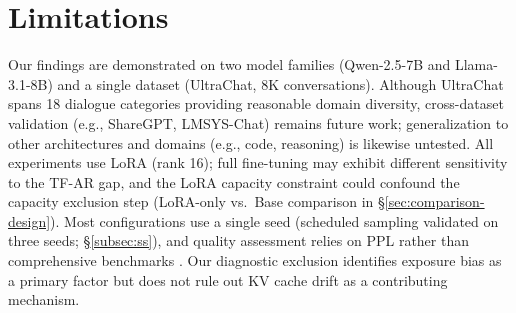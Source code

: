 \section*{Limitations}\label{sec:limitations}

Our findings are demonstrated on two model families (Qwen-2.5-7B and Llama-3.1-8B) and a single dataset (UltraChat, 8K conversations). Although UltraChat spans 18 dialogue categories providing reasonable domain diversity, cross-dataset validation (e.g., ShareGPT, LMSYS-Chat) remains future work; generalization to other architectures and domains (e.g., code, reasoning) is likewise untested. All experiments use LoRA (rank 16); full fine-tuning may exhibit different sensitivity to the TF-AR gap, and the LoRA capacity constraint could confound the capacity exclusion step (LoRA-only vs.\ Base comparison in \S\ref{sec:comparison-design}). Most configurations use a single seed (scheduled sampling validated on three seeds; \S\ref{subsec:ss}), and quality assessment relies on PPL rather than comprehensive benchmarks \citep{hendrycks2021measuring,lin2022truthfulqa}. Our diagnostic exclusion identifies exposure bias as a primary factor but does not rule out KV cache drift as a contributing mechanism.